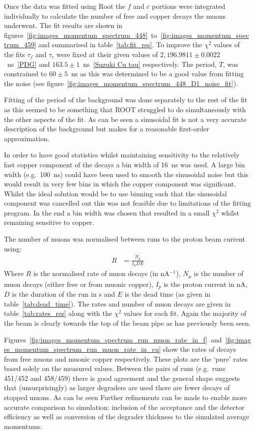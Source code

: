 Once the data was fitted using Root the \(f\) and \(c\) portions were integrated individually to calculate the number of free and copper decays the muons underwent. The fit results are shown in figures~\ref{fig:images_momentum_spectrum_448}~to~\ref{fig:images_momentum_spectrum_459} and summarised in table~\ref{tab:fit_res}. To improve the \(\chi^2\) values of the fits \(\tau_{f}\) and \(\tau_{c}\) were fixed at their given values of \(2,196.9811\pm0.0022 \)~ns~\ref{PDG} and \( 163.5\pm1 \)~ns~\ref{Suzuki Cu tau} respectively. The period, \(T\), was constrained to \(60\pm5\)~ns as this was determined to be a good value from fitting the noise (see figure~\ref{fig:images_momentum_spectrum_448_D1_noise_fit}). 

Fitting of the period of the background was done separately to the rest of the fit as this seemed to be something that ROOT struggled to do simultaneously with the other aspects of the fit. As can be seen a sinusoidal fit is not a very accurate description of the background but makes for a reasonable first-order approximation. 

In order to have good statistics whilst maintaining sensitivity to the relatively fast copper component of the decays a bin width of 16~ns was used. A large bin width (e.g.\ 100~ns) could have been used to smooth the sinusoidal noise but this would result in very few bins in which the copper component was significant. Whilst the ideal solution would be to use binning such that the sinusoidal component was cancelled out this was not feasible due to limitations of the fitting program. In the end a bin width was chosen that resulted in a small \(\chi^2\) whilst remaining sensitive to copper.

The number of muons was normalised between runs to the proton beam current using:
\begin{align}
  R &= \frac{N_{\mu}}{I_p D E} \label{equ:rate}
\end{align}
Where \( R \) is the normalised rate of muon decays (in nA\(^{-1}\)), \(N_{\mu}\) is the number of muon decays (either free or from muonic copper), \( I_p \) is the proton current in nA, \( D \) is the duration of the run in s and \( E \) is the dead time (as given in table~\ref{tab:dead_time}). The rates and number of muon decays are given in table~\ref{tab:rates_res} along with the \(\chi^2\) values for each fit. Again the majority of the beam is clearly towards the top of the beam pipe as has previously been seen.

Figures~\ref{fig:images_momentum_spectrum_run_muon_rate_in_f}~and~\ref{fig:images_momentum_spectrum_run_muon_rate_in_cu} show the rates of decays from free muons and muonic copper respectively. These plots are the `pure' rates based solely on the measured values. Between the pairs of runs (e.g.\ runs 451/452 and 458/459) there is good agreement and the general shape suggests that (unsurprisingly) as larger degraders are used there are fewer decays of stopped muons. As can be seen Further refinements can be made to enable more accurate comparison to simulation: inclusion of the acceptance and the detector efficiency as well as conversion of the degrader thickness to the simulated average momentums.


